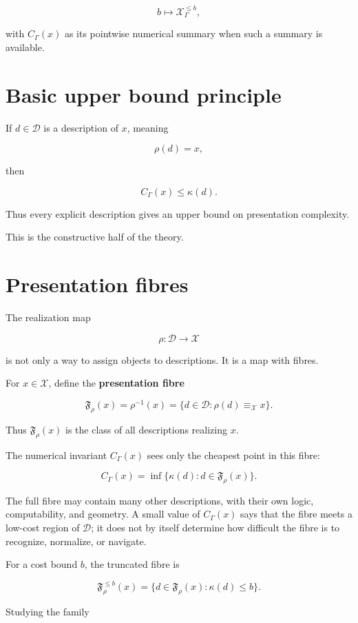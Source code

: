 \documentclass[11pt]{article}
\begin{document}
\[
b\mapsto \mathcal X_\Gamma^{\leq b},
\]

with \(C_\Gamma(x)\) as its pointwise numerical summary when such a summary is available.


\section{Basic upper bound principle}

If \(d\in\mathcal D\) is a description of \(x\), meaning

\[
\rho(d)=x,
\]

then

\[
C_\Gamma(x)\leq \kappa(d).
\]

Thus every explicit description gives an upper bound on presentation complexity.

This is the constructive half of the theory.


\section{Presentation fibres}

The realization map

\[
\rho:\mathcal D\to\mathcal X
\]

is not only a way to assign objects to descriptions. It is a map with fibres.

For \(x\in\mathcal X\), define the \textbf{presentation fibre}

\[
\mathfrak F_\rho(x)=\rho^{-1}(x)=\{d\in\mathcal D:\rho(d)\equiv_\mathcal X x\}.
\]

Thus \(\mathfrak F_\rho(x)\) is the class of all descriptions realizing \(x\).

The numerical invariant \(C_\Gamma(x)\) sees only the cheapest point in this fibre:

\[
C_\Gamma(x)=\inf\{\kappa(d):d\in\mathfrak F_\rho(x)\}.
\]

The full fibre may contain many other descriptions, with their own logic, computability, and geometry. A small value of \(C_\Gamma(x)\) says that the fibre meets a low-cost region of \(\mathcal D\); it does not by itself determine how difficult the fibre is to recognize, normalize, or navigate.

For a cost bound \(b\), the truncated fibre is

\[
\mathfrak F_\rho^{\leq b}(x)=\{d\in\mathfrak F_\rho(x):\kappa(d)\leq b\}.
\]

Studying the family
\end{document}
